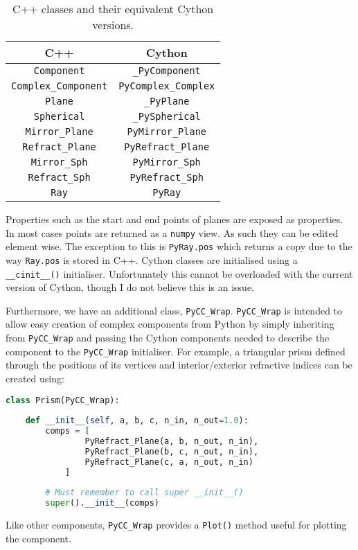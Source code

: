 \documentclass{article}
\begin{document}
\begin{table}[h!]
\centering
    \begin{tabular}{ |c|c| } 
         \hline
         C++ & Cython \\ 
         \hline
         \texttt{Component} & \texttt{\_PyComponent} \\ 
         \texttt{Complex\_Component} & \texttt{PyComplex\_Complex} \\ 
         \texttt{Plane} & \texttt{\_PyPlane} \\ 
         \texttt{Spherical} & \texttt{\_PySpherical} \\ 
         \texttt{Mirror\_Plane} & \texttt{PyMirror\_Plane} \\ 
         \texttt{Refract\_Plane} & \texttt{PyRefract\_Plane} \\ 
         \texttt{Mirror\_Sph} & \texttt{PyMirror\_Sph} \\ 
         \texttt{Refract\_Sph} & \texttt{PyRefract\_Sph} \\ 
         \texttt{Ray} & \texttt{PyRay} \\ 
         \hline
         
    \end{tabular}
    \caption{C++ classes and their equivalent Cython versions.}
    \label{tab:C++ to Cython mappings}
\end{table}

Properties such as the start and end points of planes are exposed as properties. In most cases points are returned as a \texttt{numpy} view. As such they can be edited element wise. The exception to this is \texttt{PyRay.pos} which returns a copy due to the way \texttt{Ray.pos} is stored in C++. Cython classes are initialised using a \texttt{\_\_cinit\_\_()} initialiser. Unfortunately this cannot be overloaded with the current version of Cython, though I do not believe this is an issue.

Furthermore, we have an additional class, \texttt{PyCC\_Wrap}. \texttt{PyCC\_Wrap} is intended to allow easy creation of complex components from Python by simply inheriting from \texttt{PyCC\_Wrap} and passing the Cython components needed to describe the component to the \texttt{PyCC\_Wrap} initialiser. For example, a triangular prism defined through the positions of its vertices and interior/exterior refractive indices can be created using:
\begin{lstlisting}[language=Python]
class Prism(PyCC_Wrap):
    
    def __init__(self, a, b, c, n_in, n_out=1.0):
        comps = [
                PyRefract_Plane(a, b, n_out, n_in),
                PyRefract_Plane(b, c, n_out, n_in),
                PyRefract_Plane(c, a, n_out, n_in)
            ]
            
        # Must remember to call super __init__()
        super().__init__(comps)  
\end{lstlisting}
Like other components, \texttt{PyCC\_Wrap} provides a \texttt{Plot()} method useful for plotting the component.
\end{document}
